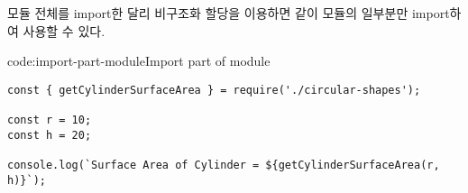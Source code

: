 모듈 전체를 import한  달리 비구조화 할당을 이용하면 \과 같이 모듈의 일부분만 import하여 사용할 수 있다.

\begin{code}{code:import-part-module}{Import part of module}
\begin{verbatim}
const { getCylinderSurfaceArea } = require('./circular-shapes');

const r = 10;
const h = 20;

console.log(`Surface Area of Cylinder = ${getCylinderSurfaceArea(r, h)}`);
\end{verbatim}
\end{code}
